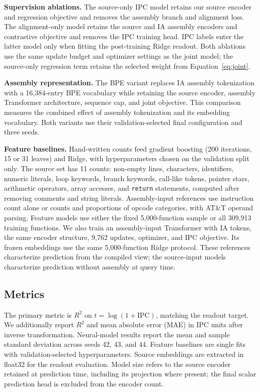 \documentclass[conference]{IEEEtran}
\newenvironment{newtext}{\begingroup}{\endgroup}
\newcommand{\Rsq}{R^{2}}
\begin{document}
\textbf{Supervision ablations.} The source-only IPC model retains our source encoder and regression objective and removes the assembly branch and alignment loss. The alignment-only model retains the source and IA assembly encoders and contrastive objective and removes the IPC training head. IPC labels enter the latter model only when fitting the post-training Ridge readout. Both ablations use the same update budget and optimizer settings as the joint model; the source-only regression term retains the selected weight from Equation~\ref{eq:joint}.

\textbf{Assembly representation.} The BPE variant replaces IA assembly tokenization with a 16,384-entry BPE vocabulary while retaining the source encoder, assembly Transformer architecture, sequence cap, and joint objective. This comparison measures the combined effect of assembly tokenization and its embedding vocabulary. Both variants use their validation-selected final configuration and three seeds.

\begin{newtext}
\textbf{Feature baselines.} Hand-written counts feed gradient boosting (200 iterations, 15 or 31 leaves) and Ridge, with hyperparameters chosen on the validation split only. The source set has 11 counts: non-empty lines, characters, identifiers, numeric literals, loop keywords, branch keywords, call-like tokens, pointer stars, arithmetic operators, array accesses, and \texttt{return} statements, computed after removing comments and string literals. Assembly-input references use instruction count alone or counts and proportions of opcode categories, with AT\&T operand parsing. Feature models use either the fixed 5,000-function sample or all 309,913 training functions. We also train an assembly-input Transformer with IA tokens, the same encoder structure, 9,762 updates, optimizer, and IPC objective. Its frozen embeddings use the same 5,000-function Ridge protocol. These references characterize prediction from the compiled view; the source-input models characterize prediction without assembly at query time.
\end{newtext}

\subsection{Metrics}
The primary metric is $\Rsq$ on $t=\log(1+\mathrm{IPC})$, matching the readout target. We additionally report $\Rsq$ and mean absolute error (MAE) in IPC units after inverse transformation. Neural-model results report the mean and sample standard deviation across seeds 42, 43, and 44. Feature baselines are single fits with validation-selected hyperparameters. Source embeddings are extracted in float32 for the readout evaluation. Model size refers to the source encoder retained at prediction time, including its projection where present; the final scalar prediction head is excluded from the encoder count.
\end{document}
